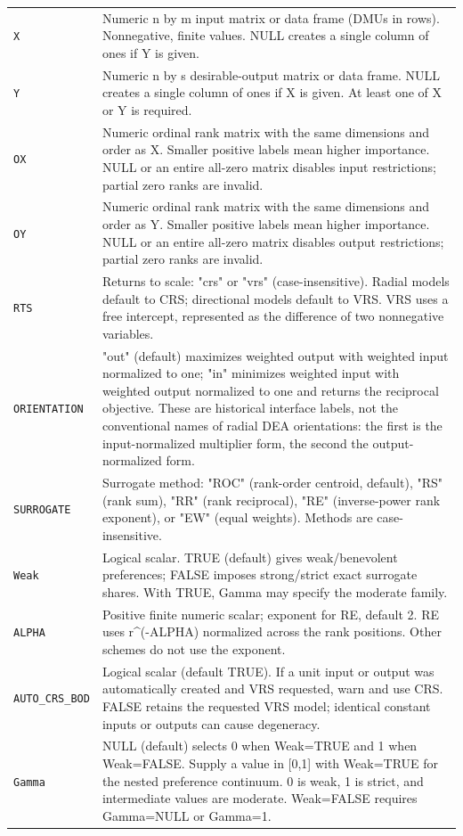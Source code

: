 \documentclass[10pt,a4paper]{article}
\begin{document}
\begin{longtable}{@{}p{53mm}p{106mm}@{}}
\texttt{X} & Numeric n by m input matrix or data frame (DMUs in rows). Nonnegative, finite values. NULL creates a single column of ones if Y is given. \\[2pt]
\texttt{Y} & Numeric n by s desirable-output matrix or data frame. NULL creates a single column of ones if X is given. At least one of X or Y is required. \\[2pt]
\texttt{OX} & Numeric ordinal rank matrix with the same dimensions and order as X. Smaller positive labels mean higher importance. NULL or an entire all-zero matrix disables input restrictions; partial zero ranks are invalid. \\[2pt]
\texttt{OY} & Numeric ordinal rank matrix with the same dimensions and order as Y. Smaller positive labels mean higher importance. NULL or an entire all-zero matrix disables output restrictions; partial zero ranks are invalid. \\[2pt]
\texttt{RTS} & Returns to scale: "crs" or "vrs" (case-insensitive). Radial models default to CRS; directional models default to VRS. VRS uses a free intercept, represented as the difference of two nonnegative variables. \\[2pt]
\texttt{ORIENTATION} & "out" (default) maximizes weighted output with weighted input normalized to one; "in" minimizes weighted input with weighted output normalized to one and returns the reciprocal objective. These are historical interface labels, not the conventional names of radial DEA orientations: the first is the input-normalized multiplier form, the second the output-normalized form. \\[2pt]
\texttt{SURROGATE} & Surrogate method: "ROC" (rank-order centroid, default), "RS" (rank sum), "RR" (rank reciprocal), "RE" (inverse-power rank exponent), or "EW" (equal weights). Methods are case-insensitive. \\[2pt]
\texttt{Weak} & Logical scalar. TRUE (default) gives weak/benevolent preferences; FALSE imposes strong/strict exact surrogate shares. With TRUE, Gamma may specify the moderate family. \\[2pt]
\texttt{ALPHA} & Positive finite numeric scalar; exponent for RE, default 2. RE uses r\textasciicircum{}(-ALPHA) normalized across the rank positions. Other schemes do not use the exponent. \\[2pt]
\texttt{AUTO\_CRS\_BOD} & Logical scalar (default TRUE). If a unit input or output was automatically created and VRS requested, warn and use CRS. FALSE retains the requested VRS model; identical constant inputs or outputs can cause degeneracy. \\[2pt]
\texttt{Gamma} & NULL (default) selects 0 when Weak=TRUE and 1 when Weak=FALSE. Supply a value in [0,1] with Weak=TRUE for the nested preference continuum. 0 is weak, 1 is strict, and intermediate values are moderate. Weak=FALSE requires Gamma=NULL or Gamma=1. \\[2pt]
\end{longtable}
\end{document}
